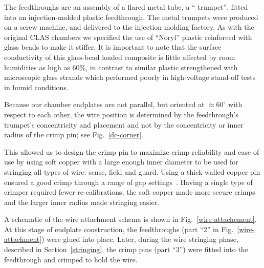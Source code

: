 The feedthroughs are an assembly of a flared metal tube, a `` trumpet'', fitted into an injection-molded 
plastic feedthrough.  The metal trumpets were produced on a screw machine, and 
delivered to the injection molding factory.
As with the original CLAS chambers we specified the use of
``Noryl'' plastic reinforced with glass beads to make it stiffer.
It is important to note that the surface conductivity
of this glass-bead loaded composite is little affected by room humidities
as high as 60\%, in contrast to similar plastic strengthened
with microscopic glass strands which performed poorly in high-voltage stand-off
tests in humid conditions.  

Because our chamber endplates are not parallel, but oriented at
$\approx 60^{\circ}$ with respect to each other, the wire position is determined
by the feedthrough's trumpet's concentricity and placement and not by
the concentricity or inner radius of the crimp pin; see Fig.~\ref{dc-corner}.

This allowed us to design the crimp pin to maximize crimp reliability
and ease of use by using soft copper with a large enough inner diameter
to be used for stringing all types of wire: sense, field and guard.
Using a thick-walled copper pin ensured a good crimp through a range of gap settings~\cite{sbc}.
Having a single type of crimper required fewer re-calibrations, the soft
copper made more secure crimps and the larger inner radius made
stringing easier.

 A schematic of the wire attachment schema is shown in
Fig.~\ref{wire-attachement}.  At this stage of endplate construction, the
feedthroughs (part ``2'' in Fig.~\ref{wire-attachment}) were glued into place.
Later, during the wire stringing phase, described in Section~\ref{stringing},
the crimp pins (part ``3'') were fitted into the feedthrough and crimped to
hold the wire.  

